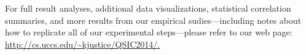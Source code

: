 
For full result analyses, additional data visualizations, statistical correlation summaries, and more results from our
empirical sudies---including notes about how to replicate all of our experimental steps---please refer to our web page:
\url{http://cs.uccs.edu/~kjustice/QSIC2014/.}



